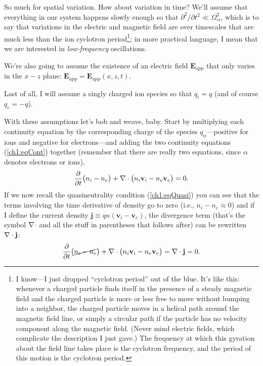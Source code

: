 So much for spatial variation. How about variation in time? We'll assume that
everything in our system happens slowly enough so that $\partial^2 / \partial
t^2 \ll \Omega_{ci}^2$, which is to say that variations in the electric and
magnetic field are over timescales that are much less than the ion cyclotron
period\footnote{I know---I just dropped ``cyclotron period'' out of the
  blue. It's like this: whenever a charged particle finds itself in the presence
  of a steady magnetic field and the charged particle is more or less free to
  move without bumping into a neighbor, the charged particle moves in a helical
  path around the magnetic field line, or simply a circular path if the particle
  has no velocity component along the magnetic field. (Never mind electric
  fields, which complicate the description I just gave.) The frequency at which
  this gyration about the field line takes place is the cyclotron frequency, and
  the period of this motion is the cyclotron period.}; in more practical
language, I mean that we are interested in \emph{low-frequency} oscillations.

We're also going to assume the existence of an electric field
$\mathbf{E}_{\textrm{app}}$ that only varies in the $x-z$ plane:
$\mathbf{E}_{\textrm{app}} = \mathbf{E}_{\textrm{app}} (x, z, t)$.

Last of all, I will assume a singly charged ion species so that $q_i = q$ (and
of course $q_e = -q$).

With these assumptions let's bob and weave, baby. Start by multiplying each
continuity equation by the corresponding charge of the species
$q_\alpha$---positive for ions and negative for electrons---and adding the two
continuity equations (\ref{ch1:eqCont}) together (remember that there are really
two equations, since $\alpha$ denotes electrons or ions),
\begin{equation} \label{ch1:eqCont1} \dfrac{\partial}{\partial t} \big (
  n_i - n_e \big ) + {\bf \nabla} \cdot \big (n_i \mathbf{v}_i - n_{e}
  \mathbf{v}_{e} \big ) = 0.
\end{equation}
If we now recall the quasineutrality condition (\ref{ch1:eqQuasi}) you can see
that the terms involving the time derivative of density go to zero (i.e., $n_i -
n_e \approx 0$) and if I define the current density $\mathbf{j} \equiv q n (
\mathbf{v}_i - \mathbf{v}_e )$, the divergence term (that's the symbol ${\bf \nabla}
\cdot$ and all the stuff in parentheses that follows after) can be rewritten
${\bf \nabla} \cdot \mathbf{j}$:
\begin{equation} \label{ch1:eqCont1} \dfrac{\partial}{\partial t} \big (
  \cancel{n_i - n_e} \big ) + {\bf \nabla} \cdot \big (n_i \mathbf{v}_i - n_{e}
  \mathbf{v}_{e} \big ) = {\bf \nabla} \cdot \mathbf{j} = 0.
\end{equation}


